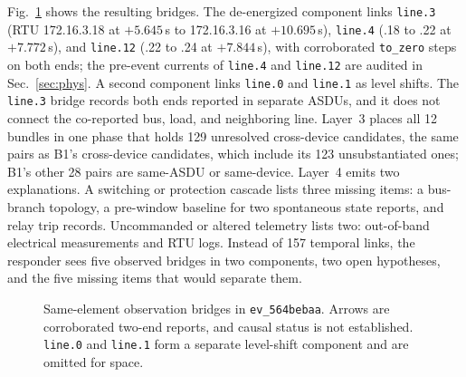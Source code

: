 \documentclass[conference]{IEEEtran}
\begin{document}
Fig.~\ref{fig:bridge} shows the resulting bridges.
The de-energized component links \texttt{line.3} (RTU 172.16.3.18 at $+5.645$\,s to 172.16.3.16 at $+10.695$\,s), \texttt{line.4} (.18 to .22 at $+7.772$\,s), and \texttt{line.12} (.22 to .24 at $+7.844$\,s), with corroborated \texttt{to\_zero} steps on both ends; the pre-event currents of \texttt{line.4} and \texttt{line.12} are audited in Sec.~\ref{sec:phys}.
A second component links \texttt{line.0} and \texttt{line.1} as level shifts.
The \texttt{line.3} bridge records both ends reported in separate ASDUs, and it does not connect the co-reported bus, load, and neighboring line.
Layer~3 places all 12 bundles in one phase that holds 129 unresolved cross-device candidates, the same pairs as B1's cross-device candidates, which include its 123 unsubstantiated ones; B1's other 28 pairs are same-ASDU or same-device.
Layer~4 emits two explanations.
A switching or protection cascade lists three missing items: a bus-branch topology, a pre-window baseline for two spontaneous state reports, and relay trip records.
Uncommanded or altered telemetry lists two: out-of-band electrical measurements and RTU logs.
Instead of 157 temporal links, the responder sees five observed bridges in two components, two open hypotheses, and the five missing items that would separate them.

\begin{figure}[t]
\centering
{}
\caption{Same-element observation bridges in \texttt{ev\_564bebaa}. Arrows are corroborated two-end reports, and causal status is not established. \texttt{line.0} and \texttt{line.1} form a separate level-shift component and are omitted for space.}
\label{fig:bridge}
\end{figure}
\end{document}
